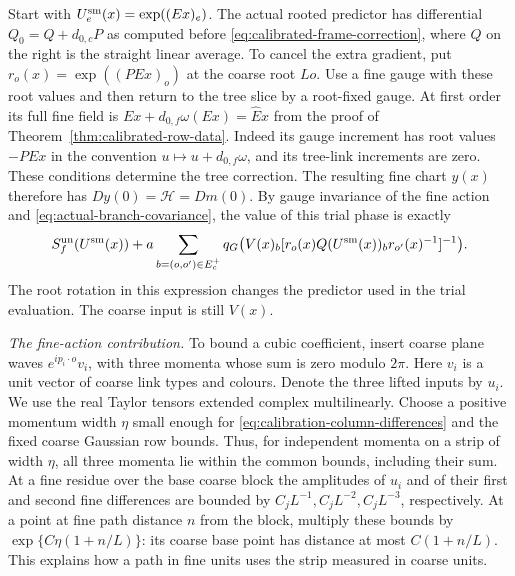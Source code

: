 \documentclass[11pt,reqno]{amsart}
\numberwithin{equation}{section}
\theoremstyle{definition}
\theoremstyle{remark}
\begin{document}
Start with \(U^{\rm sm}_e(x)=\exp((Ex)_e)\). The actual
rooted predictor has differential \(Q_0=Q+d_{0,c}P\)
as computed before \eqref{eq:calibrated-frame-correction},
where \(Q\) on the right is the straight linear average.
To cancel the extra gradient, put
\(r_o(x)=\exp((PEx)_o)\) at the coarse root \(Lo\).
Use a fine gauge with these root values and then return to
the tree slice by a root-fixed gauge. At first order its
full fine field is \(Ex+d_{0,f}\omega(Ex)=\widehat E x\)
from the proof of Theorem~\ref{thm:calibrated-row-data}.
Indeed its gauge increment has root values \(-PEx\) in
the convention \(u\mapsto u+d_{0,f}\omega\), and its
tree-link increments are zero. These conditions determine
the tree correction. The resulting fine chart \(y(x)\)
therefore has \(Dy(0)=\mathcal H=Dm(0)\).
By gauge invariance of the fine action and
\eqref{eq:actual-branch-covariance}, the value of this trial
phase is exactly
\begin{equation}
 S_f^{\rm un}(U^{\rm sm}(x))
   +a\sum_{b=(o,o')\in E_c^+}
           q_G\bigl(V(x)_b
                [r_o(x)Q(U^{\rm sm}(x))_b r_{o'}(x)^{-1}]^{-1}\bigr).
 \label{eq:cubic-smooth-trial}
\end{equation}
The root rotation in this expression changes the predictor
used in the trial evaluation. The coarse input is still
\(V(x)\).

\smallskip\noindent
\emph{The fine-action contribution.}
To bound a cubic coefficient, insert coarse plane waves
\(e^{ip_i\cdot o}v_i\), with three momenta whose sum is zero
modulo \(2\pi\). Here \(v_i\) is a unit vector of coarse link
types and colours. Denote the three lifted inputs by \(u_i\).
We use the real Taylor tensors extended complex multilinearly.
Choose a positive momentum width \(\eta\) small enough for
\eqref{eq:calibration-column-differences} and the fixed
coarse Gaussian row bounds. Thus, for independent momenta
on a strip of width \(\eta\), all three momenta lie within
the common bounds, including their sum. At a fine residue
over the base coarse block the amplitudes of \(u_i\) and of
their first and second fine differences are bounded by
\(C_jL^{-1},C_jL^{-2},C_jL^{-3}\), respectively.
At a point at fine path distance \(n\) from the block,
multiply these bounds by
\(\exp\{C\eta(1+n/L)\}\): its coarse base point has distance
at most \(C(1+n/L)\). This explains how a path in fine units
uses the strip measured in coarse units.
\end{document}
